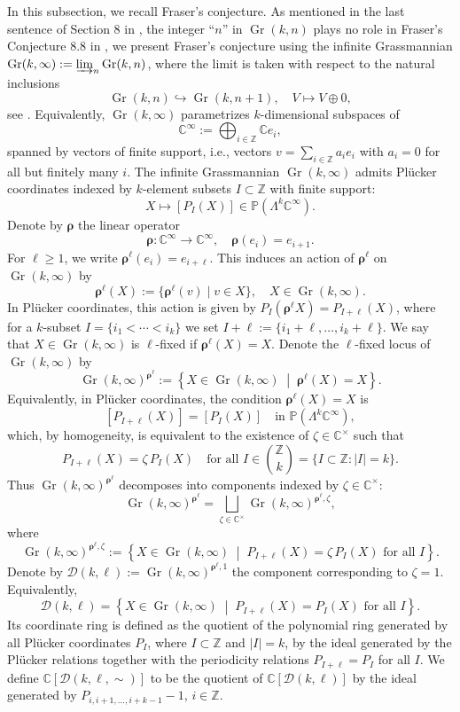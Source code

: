 \documentclass[11pt, reqno]{amsart}
\theoremstyle{plain}
\theoremstyle{definition}
\numberwithin{equation}{section}
\newcommand{\CC}{{\mathbb {C}}}
\newcommand{\ZZ}{{\mathbb {Z}}}
\DeclareMathOperator{\Gr}{Gr}
\begin{document}
In this subsection, we recall Fraser's conjecture. As mentioned in the last sentence of Section 8 in \cite{Fra20}, the integer ``$n$'' in $\Gr(k,n)$ plays no role in Fraser's Conjecture 8.8 in \cite{Fra20}, we present Fraser's conjecture using the infinite Grassmannian $\Gr(k, \infty):= \varinjlim_{n} \Gr(k,n)$, where the limit is taken with respect to the natural inclusions
\[
\Gr(k,n) \hookrightarrow \Gr(k,n+1),  \quad V \mapsto V \oplus 0,
\]
see \cite{Sato89, SW85}. Equivalently, $\Gr(k,\infty)$ parametrizes $k$-dimensional subspaces of
\[
\CC^\infty := \bigoplus_{i\in \ZZ} \CC e_i,
\]
spanned by vectors of finite support, i.e., vectors $v = \sum_{i\in \ZZ} a_i e_i$ with $a_i=0$ for all but finitely many $i$.
The infinite Grassmannian $\Gr(k,\infty)$ admits Plücker coordinates indexed by $k$-element subsets $I \subset \mathbb{Z}$ with finite support:
\[
X \longmapsto [P_I(X)] \in \mathbb{P}(\Lambda^k \CC^\infty).
\]
Denote by $\boldsymbol{\rho}$ the linear operator
\[
\boldsymbol{\rho} : \CC^\infty \to \CC^\infty, \quad \boldsymbol{\rho}(e_i) = e_{i+1}.
\]
For $\ell \ge 1$, we write $\boldsymbol{\rho}^\ell(e_i) = e_{i+\ell}$.
This induces an action of $\boldsymbol{\rho}^\ell$ on $\Gr(k,\infty)$ by
\[
\boldsymbol{\rho}^\ell(X) := \{ \boldsymbol{\rho}^\ell(v) \mid v \in X \}, \quad X \in \Gr(k,\infty).
\]
In Plücker coordinates, this action is given by $P_I(\boldsymbol{\rho}^\ell X) = P_{I+\ell}(X)$,
where for a $k$-subset $I=\{i_1<\cdots<i_k\}$ we set $I+\ell := \{i_1+\ell,\dots,i_k+\ell\}$. We say that $X \in \Gr(k,\infty)$ is $\ell$-fixed if $\boldsymbol{\rho}^\ell(X) = X$. 
Denote the $\ell$-fixed locus of $\Gr(k,\infty)$ by
\[
\Gr(k,\infty)^{\boldsymbol{\rho}^\ell} := \left\{ X \in \Gr(k,\infty) \;\middle|\; \boldsymbol{\rho}^\ell(X)=X \right\}.
\]
Equivalently, in Plücker coordinates, the condition $\boldsymbol{\rho}^\ell(X) = X$ is
\[
[P_{I+\ell}(X)] = [P_I(X)]
\quad \text{in } \mathbb{P}(\Lambda^k \mathbb{C}^\infty),
\]
which, by homogeneity, is equivalent to the existence of $\zeta \in \mathbb{C}^{\times}$ such that
\[
P_{I+\ell}(X) = \zeta\, P_I(X) \quad \text{for all } I \in \binom{\mathbb{Z}}{k} = \{I \subset \ZZ: |I|=k\}.
\]
Thus $\Gr(k,\infty)^{\boldsymbol{\rho}^\ell}$ decomposes into components indexed by $\zeta \in \mathbb{C}^{\times}$:
\[
\Gr(k,\infty)^{\boldsymbol{\rho}^\ell} =\bigsqcup_{\zeta \in \mathbb{C}^{\times}}\Gr(k,\infty)^{\boldsymbol{\rho}^\ell,\zeta},
\]
where
\[
\Gr(k,\infty)^{\boldsymbol{\rho}^\ell,\zeta}:=\left\{X \in \Gr(k,\infty)\;\middle|\;P_{I+\ell}(X) = \zeta\, P_I(X)\text{ for all } I\right\}.
\]
Denote by $\mathcal{D}(k,\ell):=\Gr(k,\infty)^{\boldsymbol{\rho}^\ell, 1}$ the component corresponding to $\zeta=1$. Equivalently,
\[
\mathcal{D}(k,\ell)=\left\{X \in \Gr(k,\infty)\;\middle|\;P_{I+\ell}(X) = P_I(X)\text{ for all } I\right\}.
\]
Its coordinate ring is defined as the quotient of the polynomial ring generated by all Plücker coordinates $P_I$, where $I \subset \mathbb{Z}$ and $|I|=k$, by the ideal generated by the Plücker relations together with the periodicity relations $P_{I+\ell} = P_I$ for all $I$. We define $\mathbb{C}[\mathcal{D}(k,\ell,\sim)]$ to be the quotient of $\mathbb{C}[\mathcal{D}(k,\ell)]$ by the ideal generated by $P_{i,i+1,\ldots,i+k-1}-1$, $i \in \ZZ$. 
\end{document}
